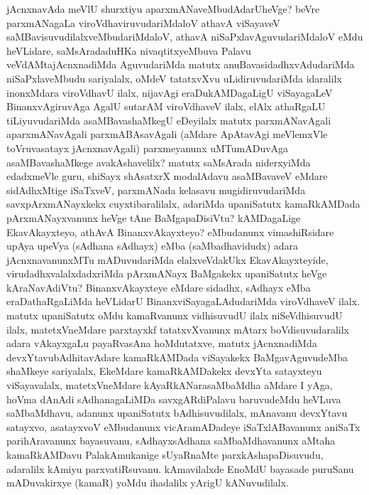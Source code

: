 



\begin{artha}
jAcnxnavAda meVlU shurxtiyu aparxmANaveMbudAdarUheVge? beVre
parxmANagaLa viroVdhaviruvudariMdaloV athavA viSayaveV
saMBavisuvudilalxveMbudariMdaloV, athavA niSaPxlavAguvudariMdaloV eMdu
heVLidare, saMsAradaduHKa nivaqtitxyeMbuva Palavu veVdAMtajAcnxnadiMda
AguvudariMda matutx anuBavasidadhxvAdudariMda niSaPxlaveMbudu
sariyalalx, oMdeV tatatxvXvu uLidiruvudariMda idaralilx inonxMdara
viroVdhavU ilalx, nijavAgi eraDukAMDagaLigU viSayagaLeV
BinanxvAgiruvAga AgalU sutarAM viroVdhaveV ilalx, elAlx athaRgaLU
tiLiyuvudariMda asaMBavashaMkegU eDeyilalx matutx parxmANavAgali
aparxmANavAgali parxmABAsavAgali (aMdare ApAtavAgi meVlemxVle
toVruvasatayx jAcnxnavAgali) parxmeyanunx uMTumADuvAga
asaMBavashaMkege avakAshavelilx? matutx saMsArada niderxyiMda
edadxmeVle guru, shiSayx shAsatxrX modalAdavu asaMBavaveV eMdare
 sidAdhxMtige iSaTxveV, parxmANada kelasavu mugidiruvudariMda
savxpArxmANayxkekx cuyxtibaralilalx, adariMda upaniSatutx kamaRkAMDada
pArxmANayxvanunx heVge tAne BaMgapaDisiVtu? kAMDagaLige EkavAkayxteyo,
athAvA BinanxvAkayxteyo? eMbudanunx vimashiRsidare upAya upeVya (sAdhana sAdhayx) eMba (saMbadhavidudx) adara jAcnxnavanunxMTu mADuvudariMda elalxveVdakUkx EkavAkayxteyide, virudadhxvalalxdadxriMda
pArxmANayx BaMgakekx upaniSatutx heVge kAraNavAdiVtu?
BinanxvAkayxteye eMdare sidadhx, sAdhayx eMba eraDathaRgaLiMda heVLidarU\break
BinanxviSayagaLAdudariMda  viroVdhaveV ilalx. matutx upaniSatutx oMdu
kamaRvanunx vidhisuvudU ilalx niSeVdhisuvudU ilalx, matetxVneMdare
parxtayxkf tatatxvXvanunx mAtarx boVdisuvudaralilx adara vAkayxgaLu
payaRvasAna hoMdutatxve, matutx jAcnxnadiMda devxYtavubAdhitavAdare
kamaRkAMDada viSayakekx BaMgavAguvudeMba shaMkeye sariyalalx, EkeMdare kamaRkAMDakekx devxYta satayxteyu viSayavalalx, matetxVneMdare kAyaRkANarasaMbaMdha aMdare I yAga, hoVma dAnAdi sAdhanagaLiMDa
savxgARdiPalavu baruvudeMdu heVLuva saMbaMdhavu, adanunx upaniSatutx
bAdhisuvudilalx, mAnavanu devxYtavu satayxvo, asatayxvoV eMbudanunx
vicAramADadeye iSaTxlABavanunx aniSaTx parihAravanunx bayasuvanu,
sAdhayxsAdhana saMbaMdhavanunx aMtaha kamaRkAMDavu PalakAmukanige
sUyaRnaMte parxkAshapaDisuvudu, adaralilx  kAmiyu parxvatiRsuvanu.
kAmavilalxde EnoMdU bayasade puruSanu mADuvakirxye (kamaR) yoMdu
ihadalilx  yArigU kANuvudilalx.
\end{artha}

